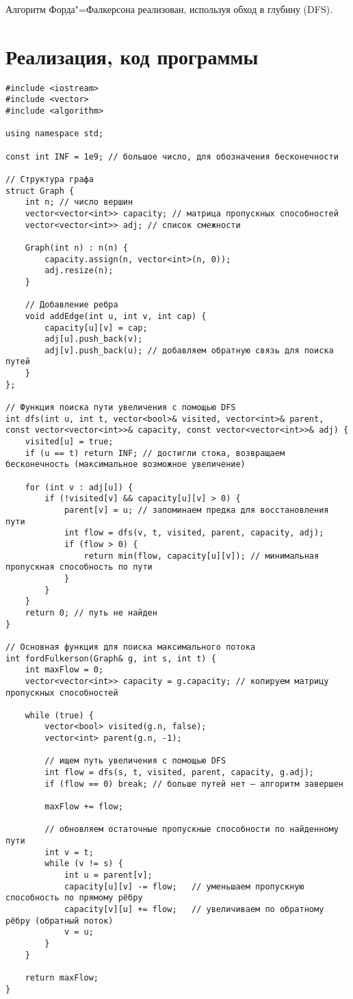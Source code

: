 \documentclass[otchet, times]{SCWorks}
\begin{document}
Алгоритм Форда"=Фалкерсона реализован, используя обход в глубину (DFS).
\section{Реализация, код программы}
\begin{verbatim}
#include <iostream>
#include <vector>
#include <algorithm>

using namespace std;

const int INF = 1e9; // большое число, для обозначения бесконечности

// Структура графа
struct Graph {
    int n; // число вершин
    vector<vector<int>> capacity; // матрица пропускных способностей
    vector<vector<int>> adj; // список смежности

    Graph(int n) : n(n) {
        capacity.assign(n, vector<int>(n, 0));
        adj.resize(n);
    }

    // Добавление ребра
    void addEdge(int u, int v, int cap) {
        capacity[u][v] = cap;
        adj[u].push_back(v);
        adj[v].push_back(u); // добавляем обратную связь для поиска путей
    }
};

// Функция поиска пути увеличения с помощью DFS
int dfs(int u, int t, vector<bool>& visited, vector<int>& parent, const vector<vector<int>>& capacity, const vector<vector<int>>& adj) {
    visited[u] = true;
    if (u == t) return INF; // достигли стока, возвращаем бесконечность (максимальное возможное увеличение)
    
    for (int v : adj[u]) {
        if (!visited[v] && capacity[u][v] > 0) {
            parent[v] = u; // запоминаем предка для восстановления пути
            int flow = dfs(v, t, visited, parent, capacity, adj);
            if (flow > 0) {
                return min(flow, capacity[u][v]); // минимальная пропускная способность по пути
            }
        }
    }
    return 0; // путь не найден
}

// Основная функция для поиска максимального потока
int fordFulkerson(Graph& g, int s, int t) {
    int maxFlow = 0;
    vector<vector<int>> capacity = g.capacity; // копируем матрицу пропускных способностей

    while (true) {
        vector<bool> visited(g.n, false);
        vector<int> parent(g.n, -1);

        // ищем путь увеличения с помощью DFS
        int flow = dfs(s, t, visited, parent, capacity, g.adj);
        if (flow == 0) break; // больше путей нет — алгоритм завершен

        maxFlow += flow;

        // обновляем остаточные пропускные способности по найденному пути
        int v = t;
        while (v != s) {
            int u = parent[v];
            capacity[u][v] -= flow;   // уменьшаем пропускную способность по прямому рёбру
            capacity[v][u] += flow;   // увеличиваем по обратному рёбру (обратный поток)
            v = u;
        }
    }

    return maxFlow;
}
\end{verbatim}
\end{document}
